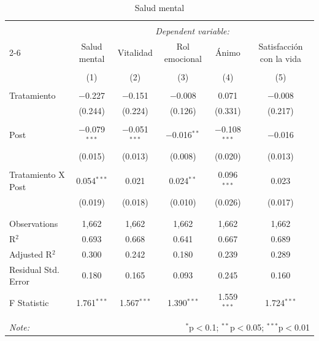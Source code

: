 
\begin{table}[H] \centering 
  \caption{Salud mental} 
  \label{reg_mental} 
\tiny 
\begin{tabular}{@{\extracolsep{-7pt}}lccccc} 
\\[-1.8ex]\hline 
\hline \\[-1.8ex] 
 & \multicolumn{5}{c}{\textit{Dependent variable:}} \\ 
\cline{2-6} 
 & Salud mental & Vitalidad & Rol emocional & Ánimo & Satisfacción con la vida \\ 
\\[-1.8ex] & (1) & (2) & (3) & (4) & (5)\\ 
\hline \\[-1.8ex] 
 Tratamiento & $-$0.227 & $-$0.151 & $-$0.008 & 0.071 & $-$0.008 \\ 
  & (0.244) & (0.224) & (0.126) & (0.331) & (0.217) \\ 
  & & & & & \\ 
 Post & $-$0.079$^{***}$ & $-$0.051$^{***}$ & $-$0.016$^{**}$ & $-$0.108$^{***}$ & $-$0.016 \\ 
  & (0.015) & (0.013) & (0.008) & (0.020) & (0.013) \\ 
  & & & & & \\ 
 Tratamiento X Post & 0.054$^{***}$ & 0.021 & 0.024$^{**}$ & 0.096$^{***}$ & 0.023 \\ 
  & (0.019) & (0.018) & (0.010) & (0.026) & (0.017) \\ 
  & & & & & \\ 
\hline \\[-1.8ex] 
Observations & 1,662 & 1,662 & 1,662 & 1,662 & 1,662 \\ 
R$^{2}$ & 0.693 & 0.668 & 0.641 & 0.667 & 0.689 \\ 
Adjusted R$^{2}$ & 0.300 & 0.242 & 0.180 & 0.239 & 0.289 \\ 
Residual Std. Error & 0.180 & 0.165 & 0.093 & 0.245 & 0.160 \\ 
F Statistic & 1.761$^{***}$ & 1.567$^{***}$ & 1.390$^{***}$ & 1.559$^{***}$ & 1.724$^{***}$ \\ 
\hline 
\hline \\[-1.8ex] 
\textit{Note:}  & \multicolumn{5}{r}{$^{*}$p$<$0.1; $^{**}$p$<$0.05; $^{***}$p$<$0.01} \\ 
\end{tabular} 
\end{table} 
